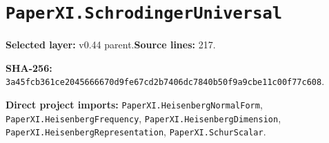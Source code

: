 \documentclass[10pt,oneside]{book}
\begin{document}
\section{\texorpdfstring{\nolinkurl{PaperXI.SchrodingerUniversal}}{PaperXI.SchrodingerUniversal}}\label{module:PaperXI.SchrodingerUniversal}

\textbf{Selected layer:} v0.44 parent.\quad\textbf{Source lines:} 217.\par\textbf{SHA-256:} {\scriptsize\nolinkurl{3a45fcb361ce2045666670d9fe67cd2b7406dc7840b50f9a9cbe11c00f77c608}}.


\textbf{Direct project imports:} \nolinkurl{PaperXI.HeisenbergNormalForm}, \nolinkurl{PaperXI.HeisenbergFrequency}, \nolinkurl{PaperXI.HeisenbergDimension}, \nolinkurl{PaperXI.HeisenbergRepresentation}, \nolinkurl{PaperXI.SchurScalar}.
\end{document}
